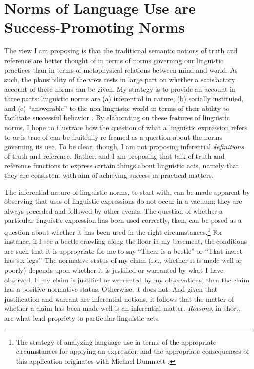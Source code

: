 \section{Norms of Language Use are Success-Promoting Norms}

The view I am proposing is that the traditional semantic notions of truth and reference are better thought of in terms of norms governing our linguistic practices than in terms of metaphysical relations between mind and world. As such, the plausibility of the view rests in large part on whether a satisfactory account of these norms can be given. My strategy is to provide an account in three parts: linguistic norms are (a) inferential in nature, (b) socially instituted, and (c) ``answerable'' to the non-linguistic world \citep{Brandom:1994} in terms of their ability to facilitate successful behavior \citep{Whyte:1990,Blackburn:2005}. By elaborating on these features of linguistic norms, I hope to illustrate how the question of what a linguistic expression refers to or is true of can be fruitfully re-framed as a question about the norms governing its use. To be clear, though, I am not proposing inferential \textit{definitions} of truth and reference. Rather, and I am proposing that talk of truth and reference functions to express certain things about linguistic acts, namely that they are consistent with aim of achieving success in practical matters.

The inferential nature of linguistic norms, to start with, can be made apparent by observing that uses of linguistic expressions do not occur in a vacuum; they are always preceded and followed by other events. The question of whether a particular linguistic expression has been used correctly, then, can be posed as a question about whether it has been used in the right circumstances.\footnote{The strategy of analyzing language use in terms of the appropriate circumstances for applying an expression and the appropriate consequences of this application originates with Michael Dummett \citep{Brandom:1994}.} For instance, if I see a beetle crawling along the floor in my basement, the conditions are such that it is appropriate for me to say ``There is a beetle'' or ``That insect has six legs.'' The normative status of my claim (i.e., whether it is made well or poorly) depends upon whether it is justified or warranted by what I have observed. If my claim is justified or warranted by my observations, then the claim has a positive normative status. Otherwise, it does not. And given that justification and warrant are inferential notions, it follows that the matter of whether a claim has been made well is an inferential matter. \textit{Reasons}, in short, are what lend propriety to particular linguistic acts.


